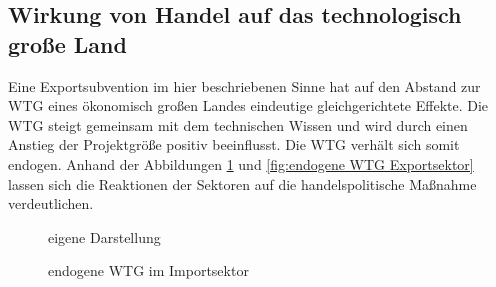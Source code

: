 \subsection{Wirkung von Handel auf das technologisch große Land}
Eine Exportsubvention im hier beschriebenen Sinne hat auf den Abstand zur WTG eines ökonomisch großen Landes eindeutige gleichgerichtete Effekte. Die WTG steigt gemeinsam mit dem technischen Wissen und wird durch einen Anstieg der Projektgröße positiv beeinflusst. Die WTG verhält sich somit endogen.  
Anhand der Abbildungen \ref{fig:endogene WTG Importsektor} und \ref{fig:endogene WTG Exportsektor} lassen sich die Reaktionen der Sektoren auf die handelspolitische Maßnahme verdeutlichen.\\
%
	\begin{figure}[htb]
		\hfill{}  eigene Darstellung
		\caption{endogene WTG im Importsektor}
		\label{fig:endogene WTG Importsektor}
	\end{figure}
%
